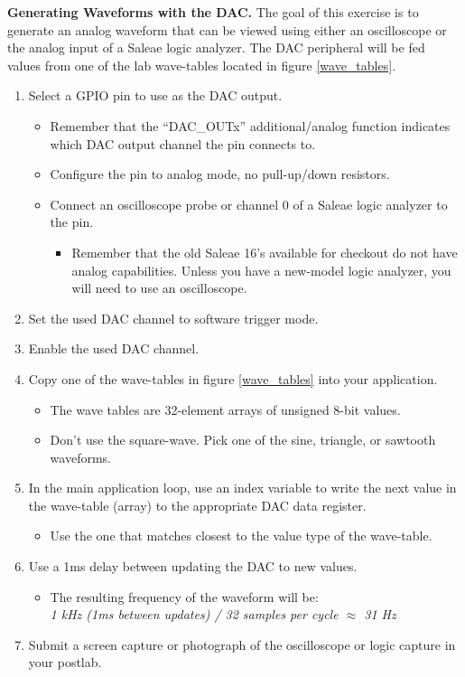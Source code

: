 \documentclass[openany,11pt,fleqn]{book} %
\begin{document}
\begin{exercise}
\textbf{Generating Waveforms with the DAC.}
The goal of this exercise is to generate an analog waveform that can be viewed using either an oscilloscope or the analog input of a Saleae logic analyzer. The DAC peripheral will be fed values from one of the lab wave-tables located in figure \ref{wave_tables}.

	\begin{enumerate}
	    \item Select a GPIO pin to use as the DAC output.
	    \begin{itemize}
	        \item Remember that the ``DAC\_OUTx'' additional/analog function indicates which DAC output channel the pin connects to. 
	        \item Configure the pin to analog mode, no pull-up/down resistors.
	        \item Connect an oscilloscope probe or channel 0 of a Saleae logic analyzer to the pin.
	        \begin{itemize}
	            \item Remember that the old Saleae 16's available for checkout do not have analog capabilities. Unless you have a new-model logic analyzer, you will need to use an oscilloscope. 
	        \end{itemize}    
	    \end{itemize}
	    \item Set the used DAC channel to software trigger mode. 
	    \item Enable the used DAC channel. 
	    \item Copy one of the wave-tables in figure \ref{wave_tables} into your application. 
	    \begin{itemize}
	        \item The wave tables are 32-element arrays of unsigned 8-bit values.
	        \item Don't use the square-wave. Pick one of the sine, triangle, or sawtooth waveforms. 
	    \end{itemize}
	    \item In the main application loop, use an index variable to write the next value in the wave-table (array) to the appropriate DAC data register. 
	    \begin{itemize}
	        \item Use the one that matches closest to the value type of the wave-table.
	    \end{itemize}
	    \item Use a 1ms delay between updating the DAC to new values. 
	    \begin{itemize}
	        \item The resulting frequency of the waveform will be: \\ \textit{1 kHz (1ms between updates) / 32 samples per cycle $\approx$ 31 Hz}
	    \end{itemize}
	    \item Submit a screen capture or photograph of the oscilloscope or logic capture in your postlab.
	\end{enumerate}
\end{exercise}
\end{document}
